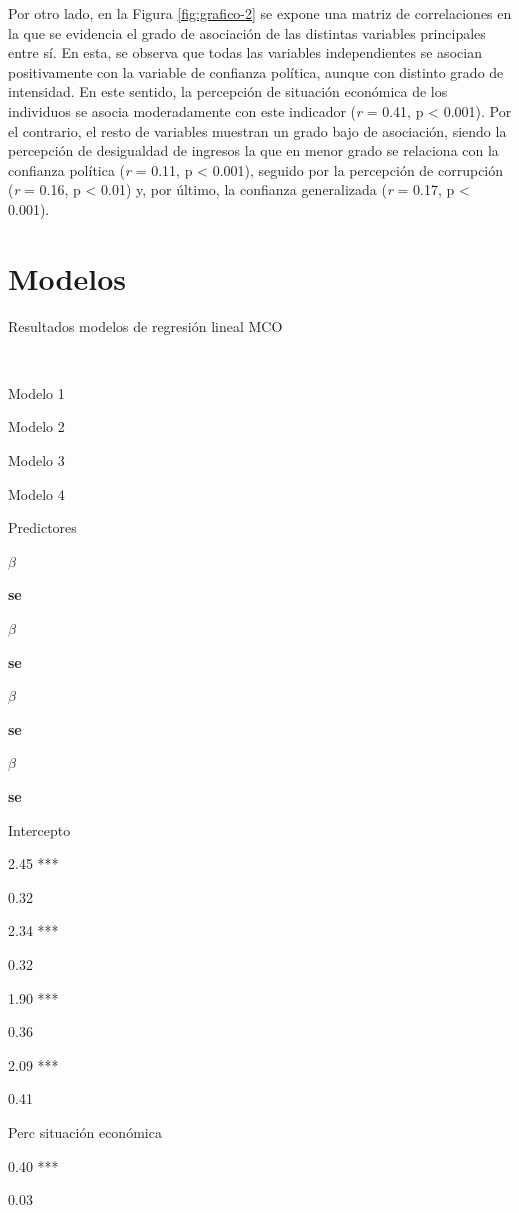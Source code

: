 \documentclass[12pt,twoside]{templates/facsothesis}
\begin{document}
Por otro lado, en la Figura \ref{fig:grafico-2} se expone una matriz de correlaciones en la que se evidencia el grado de asociación de las distintas variables principales entre sí. En esta, se observa que todas las variables independientes se asocian positivamente con la variable de confianza política, aunque con distinto grado de intensidad. En este sentido, la percepción de situación económica de los individuos se asocia moderadamente con este indicador (\emph{r} = 0.41, p \textless{} 0.001). Por el contrario, el resto de variables muestran un grado bajo de asociación, siendo la percepción de desigualdad de ingresos la que en menor grado se relaciona con la confianza política (\emph{r} = 0.11, p \textless{} 0.001), seguido por la percepción de corrupción (\emph{r} = 0.16, p \textless{} 0.01) y, por último, la confianza generalizada (\emph{r} = 0.17, p \textless{} 0.001).

\section{Modelos}\label{modelos}

\label{tab:tabla-regresiones} Resultados modelos de regresión lineal MCO

~

Modelo 1

Modelo 2

Modelo 3

Modelo 4

Predictores

\textbf{\(\beta\)}

\textbf{se}

\textbf{\(\beta\)}

\textbf{se}

\textbf{\(\beta\)}

\textbf{se}

\textbf{\(\beta\)}

\textbf{se}

Intercepto

2.45 ***

0.32

2.34 ***

0.32

1.90 ***

0.36

2.09 ***

0.41

Perc situación económica

0.40 ***

0.03
\end{document}
